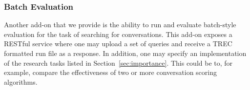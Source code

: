 \vspace{-8pt}
\subsubsection{Batch Evaluation}

Another add-on that we provide is the ability to run and evaluate batch-style evaluation for the task of searching for conversations. This add-on exposes a RESTful service where one may upload a set of queries and receive a TREC formatted run file as a response. In addition, one may specify an implementation of the research tasks listed in Section~\ref{sec:importance}. This could be to, for example, compare the effectiveness of two or more conversation scoring algorithms. 


%




